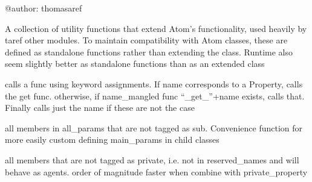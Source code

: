 \documentclass[letterpaper,10pt,english]{sphinxmanual}
\begin{document}
@author: thomasaref

A collection of utility functions that extend Atom's functionality, used heavily by taref other modules.
To maintain compatibility with Atom classes, these are defined as standalone functions rather than extending the class.
Runtime also seem slightly better as standalone functions than as an extended class

\begin{fulllineitems}
\label{core_doc/atom_extension:taref.core.atom_extension.call_func}
calls a func using keyword assignments. If name corresponds to a Property, calls the get func.
otherwise, if name\_mangled func ``\_get\_''+name exists, calls that. Finally calls just the name if these are not the case

\end{fulllineitems}


\begin{fulllineitems}
\label{core_doc/atom_extension:taref.core.atom_extension.get_all_main_params}
all members in all\_params that are not tagged as sub.
Convenience function for more easily custom defining main\_params in child classes

\end{fulllineitems}


\begin{fulllineitems}
\label{core_doc/atom_extension:taref.core.atom_extension.get_all_params}
all members that are not tagged as private, i.e. not in reserved\_names and will behave as agents.
order of magnitude faster when combine with private\_property

\end{fulllineitems}

\end{document}
